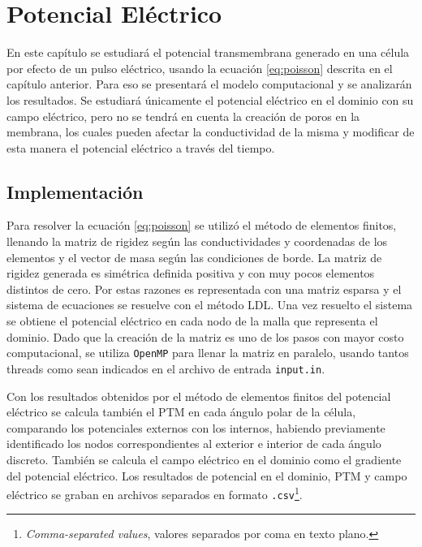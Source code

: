 \chapter{Potencial Eléctrico} \label{chap:itv}

En este capítulo se estudiará el potencial transmembrana generado en una célula por efecto de un pulso eléctrico, usando la ecuación \ref{eq:poisson} descrita en el capítulo anterior. Para eso se presentará el modelo computacional y se analizarán los resultados. Se estudiará únicamente el potencial eléctrico en el dominio con su campo eléctrico, pero no se tendrá en cuenta la creación de poros en la membrana, los cuales pueden afectar la conductividad de la misma y modificar de esta manera el potencial eléctrico a través del tiempo. 

\section{Implementación}

Para resolver la ecuación \ref{eq:poisson} se utilizó el método de elementos finitos, llenando la matriz de rigidez según las conductividades y coordenadas de los elementos y el vector de masa según las condiciones de borde. La matriz de rigidez generada es simétrica definida positiva y con muy pocos elementos distintos de cero. Por estas razones es representada con una matriz esparsa y el sistema de ecuaciones se resuelve con el método LDL. Una vez resuelto el sistema se obtiene el potencial eléctrico en cada nodo de la malla que representa el dominio. Dado que la creación de la matriz es uno de los pasos con mayor costo computacional, se utiliza \texttt{OpenMP} para llenar la matriz en paralelo, usando tantos threads como sean indicados en el archivo de entrada \texttt{input.in}.

Con los resultados obtenidos por el método de elementos finitos del potencial eléctrico se calcula también el PTM en cada ángulo polar de la célula, comparando los potenciales externos con los internos, habiendo previamente identificado los nodos correspondientes al exterior e interior de cada ángulo discreto. También se calcula el campo eléctrico en el dominio como el gradiente del potencial eléctrico. Los resultados de potencial en el dominio, PTM y campo eléctrico se graban en archivos separados en formato \texttt{.csv}\footnote{\textit{Comma-separated values}, valores separados por coma en texto plano.}. 

